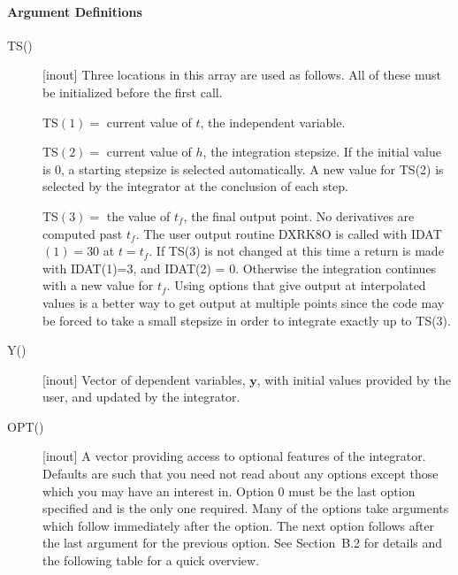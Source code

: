 \documentclass[twoside]{MATH77}
\begin{document}
\paragraph{Argument Definitions\label{ArgDefs}}
\begin{description}
\item[TS()]  [inout] Three locations in this array are used as follows.
All of these must be initialized before the first call.

TS$(1)=$ current value of $t$, the independent variable.

TS$(2)=$ current value of $h$, the integration stepsize.  If the initial
value is 0, a starting stepsize is selected automatically.  A new value
for TS(2) is selected by the integrator at the conclusion of each step.

TS$(3)=$ the value of $t_f$, the final output point.  No derivatives
are computed past $t_f$. The user output routine DXRK8O is called with
IDAT$(1)=30$ at $t=t_f$. If TS(3) is not changed at this time a return
is made with IDAT(1)=3, and IDAT(2) = 0.  Otherwise the integration
continues with a new value for $t_f$.  Using options that give output
at interpolated values is a better way to get output at multiple
points since the code may be forced to take a small stepsize in order
to integrate exactly up to TS(3).

\item[Y()]  [inout] Vector of dependent variables, ${\mathbf y}$, with initial
values provided by the user, and updated by the integrator.

\item[OPT()] [inout] A vector providing access to optional features of the
integrator.  Defaults are such that you need not read about any options
except those which you may have an interest in.  Option 0 must be the last
option specified and is the only one required.  Many of the options take
arguments which follow immediately after the option.  The next option
follows after the last argument for the previous option.  See Section~B.2
for details and the following table for a quick overview.


\end{description}
\end{document}
